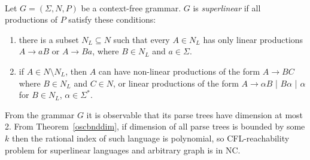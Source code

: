 \begin{example}
\\
Let $G = (\Sigma, N, P)$ be a context-free grammar. $G$ is \textit{superlinear} if all productions of $P$ satisfy these conditions:
\begin{enumerate}
\item there is a subset $N_L \subseteq N$ such that every $A \in N_L$ has only linear productions $A\rightarrow aB$ or $A\rightarrow Ba$, where $B \in N_L$ and $a \in \Sigma$.
\item if $A \in N \setminus N_L$, then $A$ can have non-linear productions of the form $A \rightarrow BC$ where $B\in N_L$ and $C \in N$, or linear productions of the form $A\rightarrow \alpha B$ | $B \alpha$ | $\alpha$ for $B \in N_L$, $\alpha \in \Sigma^*$.
\end{enumerate}
From the grammar $G$ it is observable that its parse trees have dimension at most 2. From 
Theorem~\ref{oscbnddim}, if dimension of all parse trees is bounded by some $k$ then the rational index of such language is polynomial, so CFL-reachability problem for superlinear languages and arbitrary graph is in NC.
\end{example}

